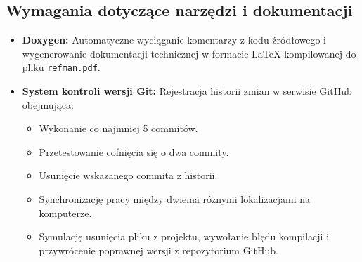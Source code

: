 \subsection{Wymagania dotyczące narzędzi i dokumentacji}
\begin{itemize}
    \item \textbf{Doxygen:} Automatyczne wyciąganie komentarzy z kodu źródłowego i wygenerowanie dokumentacji technicznej w formacie \LaTeX{} kompilowanej do pliku \texttt{refman.pdf}.
    \item \textbf{System kontroli wersji Git:} Rejestracja historii zmian w serwisie GitHub obejmująca:
    \begin{itemize}
        \item Wykonanie co najmniej 5 commitów.
        \item Przetestowanie cofnięcia się o dwa commity.
        \item Usunięcie wskazanego commita z historii.
        \item Synchronizację pracy między dwiema różnymi lokalizacjami na komputerze.
        \item Symulację usunięcia pliku z projektu, wywołanie błędu kompilacji i przywrócenie poprawnej wersji z repozytorium GitHub.
    \end{itemize}
\end{itemize}